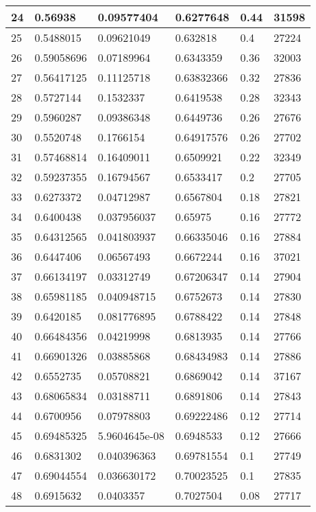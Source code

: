 \begin{longtable}{|l|l|l|l|l|l|}
24 & 0.56938 & 0.09577404 & 0.6277648 & 0.44 & 31598 \\ \hline 
25 & 0.5488015 & 0.09621049 & 0.632818 & 0.4 & 27224 \\ \hline 
26 & 0.59058696 & 0.07189964 & 0.6343359 & 0.36 & 32003 \\ \hline 
27 & 0.56417125 & 0.11125718 & 0.63832366 & 0.32 & 27836 \\ \hline 
28 & 0.5727144 & 0.1532337 & 0.6419538 & 0.28 & 32343 \\ \hline 
29 & 0.5960287 & 0.09386348 & 0.6449736 & 0.26 & 27676 \\ \hline 
30 & 0.5520748 & 0.1766154 & 0.64917576 & 0.26 & 27702 \\ \hline 
31 & 0.57468814 & 0.16409011 & 0.6509921 & 0.22 & 32349 \\ \hline 
32 & 0.59237355 & 0.16794567 & 0.6533417 & 0.2 & 27705 \\ \hline 
33 & 0.6273372 & 0.04712987 & 0.6567804 & 0.18 & 27821 \\ \hline 
34 & 0.6400438 & 0.037956037 & 0.65975 & 0.16 & 27772 \\ \hline 
35 & 0.64312565 & 0.041803937 & 0.66335046 & 0.16 & 27884 \\ \hline 
36 & 0.6447406 & 0.06567493 & 0.6672244 & 0.16 & 37021 \\ \hline 
37 & 0.66134197 & 0.03312749 & 0.67206347 & 0.14 & 27904 \\ \hline 
38 & 0.65981185 & 0.040948715 & 0.6752673 & 0.14 & 27830 \\ \hline 
39 & 0.6420185 & 0.081776895 & 0.6788422 & 0.14 & 27848 \\ \hline 
40 & 0.66484356 & 0.04219998 & 0.6813935 & 0.14 & 27766 \\ \hline 
41 & 0.66901326 & 0.03885868 & 0.68434983 & 0.14 & 27886 \\ \hline 
42 & 0.6552735 & 0.05708821 & 0.6869042 & 0.14 & 37167 \\ \hline 
43 & 0.68065834 & 0.03188711 & 0.6891806 & 0.14 & 27843 \\ \hline 
44 & 0.6700956 & 0.07978803 & 0.69222486 & 0.12 & 27714 \\ \hline 
45 & 0.69485325 & 5.9604645e-08 & 0.6948533 & 0.12 & 27666 \\ \hline 
46 & 0.6831302 & 0.040396363 & 0.69781554 & 0.1 & 27749 \\ \hline 
47 & 0.69044554 & 0.036630172 & 0.70023525 & 0.1 & 27835 \\ \hline 
48 & 0.6915632 & 0.0403357 & 0.7027504 & 0.08 & 27717 \\ \hline 

\end{longtable}

